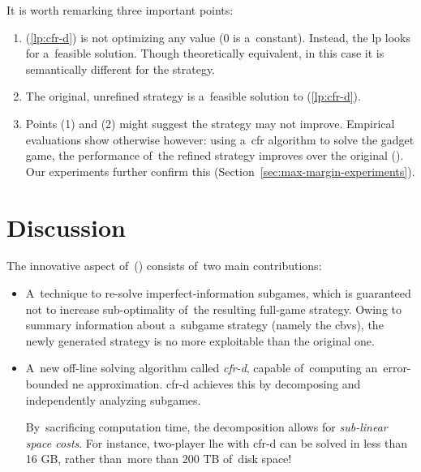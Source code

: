 It is worth remarking three important points:
\begin{enumerate}[(1)]
  \item (\ref{lp:cfr-d}) is not optimizing any value ($0$ is a~constant).
    Instead, the \acrshort{lp} looks for a~feasible solution.
    Though theoretically equivalent, in this case it is semantically different for the strategy.
  \item The original, unrefined strategy is a~feasible solution to (\ref{lp:cfr-d}).
  \item Points (1) and (2) might suggest the strategy may not improve.
    Empirical evaluations show otherwise however:
    using a~\acrshort{cfr} algorithm to solve the gadget game, the performance of~the refined strategy improves over the original (\cite{BurchJohansonBowling13}).
    Our experiments further confirm this (Section~\ref{sec:max-margin-experiments}).
\end{enumerate}

\section{Discussion}
The innovative aspect of~(\cite{BurchJohansonBowling13}) consists of~two main contributions:
\begin{itemize}[(i)]
  \item A~technique to re-solve imperfect-information subgames, which is guaranteed not to increase sub-optimality of~the resulting full-game strategy.
    Owing to summary information about a~subgame strategy (namely the \acrlong{cbv}s), the newly generated strategy is no more exploitable than the original one.

  \item A~new off-line solving algorithm called \emph{\acrfull{cfr-d}}, capable of~computing an~error-bounded \acrshort{ne} approximation.
    \acrshort{cfr-d} achieves this by decomposing and independently analyzing subgames.

    By~sacrificing computation time, the decomposition allows for \emph{sub-linear space costs}.
    For instance, two-player \acrshort{lhe} with \acrshort{cfr-d} can be solved in less than 16 GB, rather than~more than 200 TB of~disk space!
\end{itemize}
